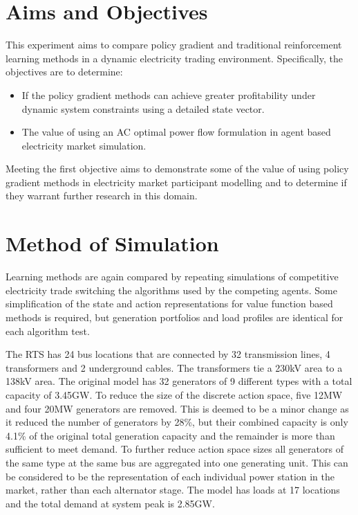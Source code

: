\section{Aims and Objectives}
This experiment aims to compare policy gradient and traditional
reinforcement learning methods in a dynamic electricity trading environment.
Specifically, the objectives are to determine:
\begin{itemize}
  \item If the policy gradient methods can achieve greater profitability
  under dynamic system constraints using a detailed state vector.
  \item The value of using an AC optimal power flow formulation in agent based
  electricity market simulation.
\end{itemize}
Meeting the first objective aims to demonstrate some of the value of using
policy gradient methods in electricity market participant modelling and to determine
if they warrant further research in this domain.

\section{Method of Simulation}
Learning methods are again compared by repeating simulations of
competitive electricity trade switching the algorithms used by the competing
agents. Some simplification of the state and action representations for value
function based methods is required, but generation portfolios and load profiles
are identical for each algorithm test.

The RTS has 24 bus locations that are connected by 32 transmission lines, 4
transformers and 2 underground cables. The transformers tie a 230kV area to a
138kV area.  The original model has 32 generators of 9 different types with a
total capacity of 3.45GW.  To reduce the size of the discrete action space, five
12MW and four 20MW generators are removed.  This is deemed to be a minor
change as it reduced the number of generators by 28\%, but their combined capacity is only
4.1\% of the original total generation capacity and the remainder is
more than sufficient to meet demand.  To further reduce action space sizes all
generators of the same type at the same bus are aggregated into one generating
unit. This can be considered to be the representation of each individual power
station in the market, rather than each alternator stage.  The model has loads
at 17 locations and the total demand at system peak is 2.85GW.

